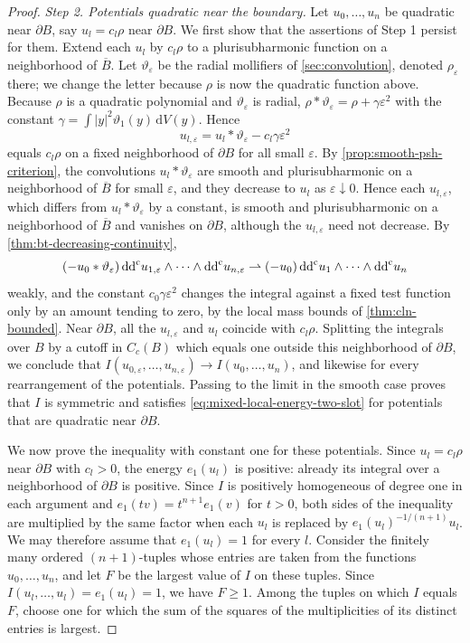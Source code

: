 \begin{proof}
\emph{Step 2. Potentials quadratic near the boundary.}
Let $u_0,\ldots,u_n$ be quadratic near $\partial B$, say $u_l=c_l\rho$ near $\partial B$. We first show that the assertions of Step 1 persist for them. Extend each $u_l$ by $c_l\rho$ to a plurisubharmonic function on a neighborhood of $\overline B$. Let $\vartheta_\varepsilon$ be the radial mollifiers of \cref{sec:convolution}, denoted $\rho_\varepsilon$ there; we change the letter because $\rho$ is now the quadratic function above. Because $\rho$ is a quadratic polynomial and $\vartheta_\varepsilon$ is radial, $\rho*\vartheta_\varepsilon=\rho+\gamma\varepsilon^2$ with the constant $\gamma=\int|y|^2\vartheta_1(y)\,\mathrm dV(y)$. Hence
\[
 u_{l,\varepsilon}=u_l*\vartheta_\varepsilon-c_l\gamma\varepsilon^2
\]
equals $c_l\rho$ on a fixed neighborhood of $\partial B$ for all small $\varepsilon$. By \cref{prop:smooth-psh-criterion}, the convolutions $u_l*\vartheta_\varepsilon$ are smooth and plurisubharmonic on a neighborhood of $\overline B$ for small $\varepsilon$, and they decrease to $u_l$ as $\varepsilon\downarrow0$. Hence each $u_{l,\varepsilon}$, which differs from $u_l*\vartheta_\varepsilon$ by a constant, is smooth and plurisubharmonic on a neighborhood of $\overline B$ and vanishes on $\partial B$, although the $u_{l,\varepsilon}$ need not decrease. By \cref{thm:bt-decreasing-continuity},
\[
 (-u_0*\vartheta_\varepsilon)\,\mathrm{dd}^{\mathrm{c}} u_{1,\varepsilon}\wedge\cdots\wedge\mathrm{dd}^{\mathrm{c}} u_{n,\varepsilon}
 \rightharpoonup(-u_0)\,\mathrm{dd}^{\mathrm{c}} u_1\wedge\cdots\wedge\mathrm{dd}^{\mathrm{c}} u_n
\]
weakly, and the constant $c_0\gamma\varepsilon^2$ changes the integral against a fixed test function only by an amount tending to zero, by the local mass bounds of \cref{thm:cln-bounded}. Near $\partial B$, all the $u_{l,\varepsilon}$ and $u_l$ coincide with $c_l\rho$. Splitting the integrals over $B$ by a cutoff in $C_c(B)$ which equals one outside this neighborhood of $\partial B$, we conclude that $I(u_{0,\varepsilon},\ldots,u_{n,\varepsilon})\to I(u_0,\ldots,u_n)$, and likewise for every rearrangement of the potentials. Passing to the limit in the smooth case proves that $I$ is symmetric and satisfies \eqref{eq:mixed-local-energy-two-slot} for potentials that are quadratic near $\partial B$.

We now prove the inequality with constant one for these potentials. Since $u_l=c_l\rho$ near $\partial B$ with $c_l>0$, the energy $e_1(u_l)$ is positive: already its integral over a neighborhood of $\partial B$ is positive. Since $I$ is positively homogeneous of degree one in each argument and $e_1(tv)=t^{n+1}e_1(v)$ for $t>0$, both sides of the inequality are multiplied by the same factor when each $u_l$ is replaced by $e_1(u_l)^{-1/(n+1)}u_l$. We may therefore assume that $e_1(u_l)=1$ for every $l$. Consider the finitely many ordered $(n+1)$-tuples whose entries are taken from the functions $u_0,\ldots,u_n$, and let $F$ be the largest value of $I$ on these tuples. Since $I(u_l,\ldots,u_l)=e_1(u_l)=1$, we have $F\geq1$. Among the tuples on which $I$ equals $F$, choose one for which the sum of the squares of the multiplicities of its distinct entries is largest.


\end{proof}

